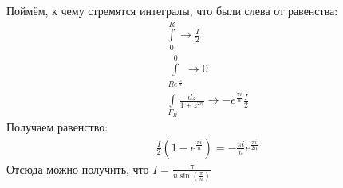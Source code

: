 \begin{example}
    Поймём, к чему стремятся интегралы, что были слева от равенства:
    \begin{gather*}
        \int\limits_{0}^R  \to \frac{I}{2}\\
        \int\limits_{Re^\frac{i \pi}{n}}^{0} \to 0\\
        \int\limits_{\Gamma_R} \frac{dz}{1+z^{2n}} \to -e^{\frac{\pi i}{n}}\frac{I}{2}
    \end{gather*}
    Получаем равенство:
    \begin{gather*}
        \frac{I}{2}(1 - e^{\frac{\pi i}{n}}) = 
        -\frac{\pi i}{n} e^{\frac{\pi i}{2n}}
    \end{gather*}
    Отсюда можно получить, что $I = \frac{\pi}{n \sin(\frac{\pi}{n})}$
\end{example}

\newpage

